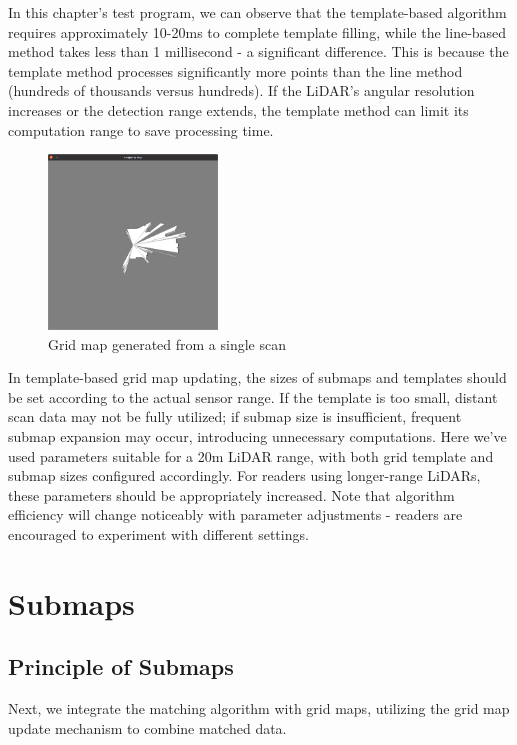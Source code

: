 In this chapter's test program, we can observe that the template-based algorithm requires approximately 10-20ms to complete template filling, while the line-based method takes less than 1 millisecond - a significant difference. This is because the template method processes significantly more points than the line method (hundreds of thousands versus hundreds). If the LiDAR's angular resolution increases or the detection range extends, the template method can limit its computation range to save processing time.

\begin{figure}[!t]
	\centering
	\includegraphics[width=0.4\textwidth]{resources/2d-lidar-mapping/oc-grid-one-scan.png}
	\caption{Grid map generated from a single scan}
	\label{fig:oc-grid-one-scan}
\end{figure}

In template-based grid map updating, the sizes of submaps and templates should be set according to the actual sensor range. If the template is too small, distant scan data may not be fully utilized; if submap size is insufficient, frequent submap expansion may occur, introducing unnecessary computations. Here we've used parameters suitable for a 20m LiDAR range, with both grid template and submap sizes configured accordingly. For readers using longer-range LiDARs, these parameters should be appropriately increased. Note that algorithm efficiency will change noticeably with parameter adjustments - readers are encouraged to experiment with different settings.

\section{Submaps}  
\subsection{Principle of Submaps}  
Next, we integrate the matching algorithm with grid maps, utilizing the grid map update mechanism to combine matched data.  

